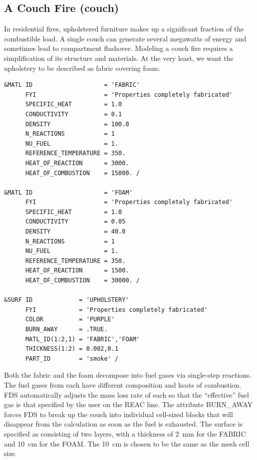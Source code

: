\documentclass[11pt]{book}
\begin{document}
\clearpage
\subsection{A Couch Fire ({\bf couch}) }

In residential fires, upholstered furniture makes up a significant fraction of the combustible load. A single couch can generate several
megawatts of energy and sometimes lead to compartment flashover. Modeling a couch fire requires a simplification of its structure and materials.
At the very least, we want the upholstery to be described as fabric covering foam:

\footnotesize
\begin{verbatim}
&MATL ID                    = 'FABRIC'
      FYI                   = 'Properties completely fabricated'
      SPECIFIC_HEAT         = 1.0
      CONDUCTIVITY          = 0.1
      DENSITY               = 100.0
      N_REACTIONS           = 1
      NU_FUEL               = 1.
      REFERENCE_TEMPERATURE = 350.
      HEAT_OF_REACTION      = 3000.
      HEAT_OF_COMBUSTION    = 15000. /

&MATL ID                    = 'FOAM'
      FYI                   = 'Properties completely fabricated'
      SPECIFIC_HEAT         = 1.0
      CONDUCTIVITY          = 0.05
      DENSITY               = 40.0
      N_REACTIONS           = 1
      NU_FUEL               = 1.
      REFERENCE_TEMPERATURE = 350.
      HEAT_OF_REACTION      = 1500.
      HEAT_OF_COMBUSTION    = 30000. /

&SURF ID             = 'UPHOLSTERY'
      FYI            = 'Properties completely fabricated'
      COLOR          = 'PURPLE'
      BURN_AWAY      = .TRUE.
      MATL_ID(1:2,1) = 'FABRIC','FOAM'
      THICKNESS(1:2) = 0.002,0.1
      PART_ID        = 'smoke' /
\end{verbatim} \normalsize

\noindent
Both the fabric and the foam decompose into fuel gases via single-step reactions. The fuel gases from each have different
composition and heats of combustion. FDS automatically adjusts the mass loss rate of each so that the ``effective'' fuel gas
is that specified by the user on the {\ct REAC} line. The attribute {\ct BURN\_AWAY} forces FDS to break up the couch into
individual cell-sized blocks that will disappear from the calculation as soon as the fuel is exhausted. The surface is specified
as consisting of two layers, with a thickness of 2~mm for the {\ct FABRIC} and 10~cm for the {\ct FOAM}. The 10~cm is chosen to be the
same as the mesh cell size.
\end{document}
